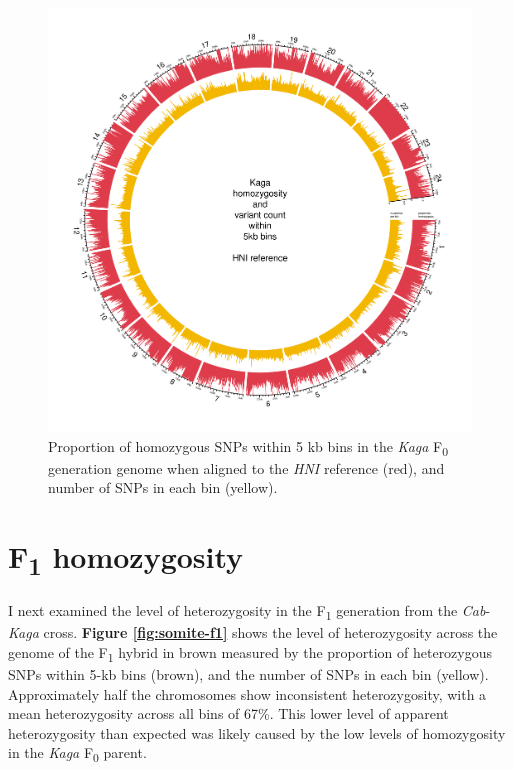 \documentclass[
]{book}
\begin{document}
\begin{figure}
\includegraphics[width=1\linewidth]{figs/somites/Kaga_HNI} \caption{Proportion of homozygous SNPs within 5 kb bins in the \emph{Kaga} F\textsubscript{0} generation genome when aligned to the \emph{HNI} reference (red), and number of SNPs in each bin (yellow).}\label{fig:somite-f0-kaga-hni}
\end{figure}

\hypertarget{f1-homozygosity}{%
\section{\texorpdfstring{F\textsubscript{1} homozygosity}{F1 homozygosity}}\label{f1-homozygosity}}

I next examined the level of heterozygosity in the F\textsubscript{1} generation from the \emph{Cab}-\emph{Kaga} cross. \textbf{Figure \ref{fig:somite-f1}} shows the level of heterozygosity across the genome of the F\textsubscript{1} hybrid in brown measured by the proportion of heterozygous SNPs within 5-kb bins (brown), and the number of SNPs in each bin (yellow). Approximately half the chromosomes show inconsistent heterozygosity, with a mean heterozygosity across all bins of 67\%. This lower level of apparent heterozygosity than expected was likely caused by the low levels of homozygosity in the \emph{Kaga} F\textsubscript{0} parent.
\end{document}
